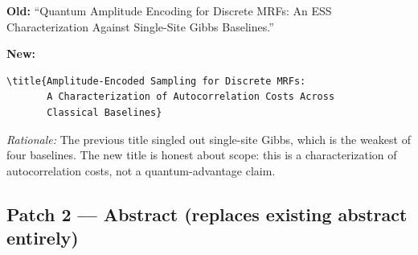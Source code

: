 \textbf{Old:} ``Quantum Amplitude Encoding for Discrete MRFs: An ESS
Characterization Against Single-Site Gibbs Baselines.''

\noindent\textbf{New:}

\begin{verbatim}
\title{Amplitude-Encoded Sampling for Discrete MRFs:
       A Characterization of Autocorrelation Costs Across
       Classical Baselines}
\end{verbatim}

\noindent\emph{Rationale:} The previous title singled out single-site Gibbs,
which is the weakest of four baselines.  The new title is honest about scope:
this is a characterization of autocorrelation costs, not a quantum-advantage
claim.

\subsection*{Patch 2 --- Abstract (replaces existing abstract entirely)}

